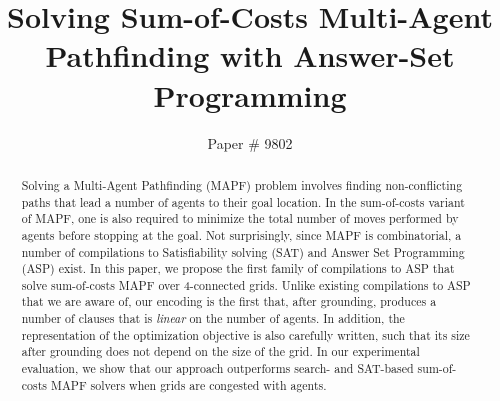 \documentclass[letterpaper]{article} %
\title{Solving Sum-of-Costs Multi-Agent Pathfinding with Answer-Set Programming}
\author{Paper \# 9802}
\begin{document}
\maketitle

\begin{abstract}
Solving a Multi-Agent Pathfinding (MAPF) problem involves finding non-conflicting paths that lead a number of agents to their goal location. In the sum-of-costs variant of MAPF, one is also required to minimize the total number of moves performed by agents before stopping at the goal. Not surprisingly, since MAPF is combinatorial, a  number of compilations to Satisfiability solving (SAT) and Answer Set Programming (ASP) exist. In this paper, we propose the first family of compilations to ASP that solve sum-of-costs MAPF over 4-connected grids. Unlike existing compilations to ASP that we are aware of, our encoding is the first that, after grounding, produces a number of clauses that is \emph{linear} on the number of agents. In addition, the representation of the optimization objective is also carefully written, such that its size after grounding does not depend on the size of the grid. In our experimental evaluation, we show that our approach outperforms search- and SAT-based sum-of-costs MAPF solvers when grids are congested with agents.
\end{abstract}












\footnotesize


\end{document}
